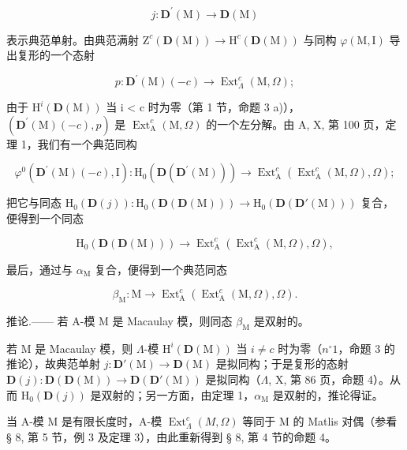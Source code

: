 \[
j: \mathbf {D} ^ {\prime} (\mathrm{M}) \rightarrow \mathbf {D} (\mathrm{M})
\]

表示典范单射。由典范满射 \(\mathrm{Z}^{c}(\mathbf{D}(\mathrm{M}))\to\mathrm{H}^{c}(\mathbf{D}(\mathrm{M}))\) 与同构 \(\varphi(\mathrm{M},\mathrm{I})\) 导出复形的一个态射

\[
p: \mathbf {D} ^ {\prime} (\mathrm{M}) (- c) \rightarrow \operatorname{Ext} _ {\Lambda} ^ {c} (\mathrm{M}, \Omega);
\]

由于 \(\mathrm{H}^{i}(\mathbf{D}(\mathrm{M}))\) 当 i \textless{} c 时为零（第 1 节，命题 3 a)），\((\mathbf{D}^{\prime}(\mathrm{M})(-c), p)\) 是 \(\operatorname{Ext}_{\mathrm{A}}^{c}(\mathrm{M}, \Omega)\) 的一个左分解。由 A, X, 第 100 页，定理 1，我们有一个典范同构

\[
\varphi^ {0} \left(\mathbf {D} ^ {\prime} (\mathrm{M}) (- c), \mathrm{I}\right): \mathrm{H} _ {0} \left(\mathbf {D} \left(\mathbf {D} ^ {\prime} (\mathrm{M})\right)\right) \longrightarrow \operatorname{Ext} _ {\mathrm{A}} ^ {c} \left(\operatorname{Ext} _ {\mathrm{A}} ^ {c} (\mathrm{M}, \Omega), \Omega\right);
\]

把它与同态 \(\mathrm{H}_{0}(\mathbf{D}(j)) : \mathrm{H}_{0}(\mathbf{D}(\mathbf{D}(\mathrm{M}))) \to \mathrm{H}_{0}(\mathbf{D}(\mathbf{D}'(\mathrm{M})))\) 复合，便得到一个同态

\[
\mathrm{H} _ {0} (\mathbf {D} (\mathbf {D} (\mathrm{M}))) \longrightarrow \operatorname{Ext} _ {\mathrm{A}} ^ {c} \left(\operatorname{Ext} _ {\mathrm{A}} ^ {c} (\mathrm{M}, \Omega), \Omega\right),
\]

最后，通过与 \(\alpha_{\mathrm{M}}\) 复合，便得到一个典范同态

\[
\beta_ {\mathrm{M}}: \mathrm{M} \longrightarrow \operatorname{Ext} _ {\mathrm{A}} ^ {c} (\operatorname{Ext} _ {\mathrm{A}} ^ {c} (\mathrm{M}, \Omega), \Omega).
\]

推论.—— 若 A-模 M 是 Macaulay 模，则同态 \(\beta_{\mathrm{M}}\) 是双射的。

若 M 是 Macaulay 模，则 \(\Lambda\)-模 \(\mathrm{H}^i(\mathbf{D}(\mathrm{M}))\) 当 \(i \neq c\) 时为零（\(n^\circ 1\)，命题 3 的推论），故典范单射 \(j: \mathbf{D}'(\mathrm{M}) \to \mathbf{D}(\mathrm{M})\) 是拟同构；于是复形的态射 \(\mathbf{D}(j): \mathbf{D}(\mathbf{D}(\mathrm{M})) \to \mathbf{D}(\mathbf{D}'(\mathrm{M}))\) 是拟同构（\(\Lambda\), X, 第 86 页，命题 4）。从而 \(\mathrm{H}_0(\mathbf{D}(j))\) 是双射的；另一方面，由定理 1，\(\alpha_{\mathrm{M}}\) 是双射的，推论得证。

当 A-模 M 是有限长度时，A-模 \(\operatorname{Ext}_{\Lambda}^{c}(M,\Omega)\) 等同于 M 的 Matlis 对偶（参看 § 8, 第 5 节，例 3 及定理 3），由此重新得到 § 8, 第 4 节的命题 4。

